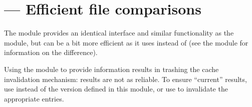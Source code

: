 \section{ ---
         Efficient file comparisons}



The  module provides an identical interface and similar
functionality as the  module, but can be a bit more efficient
as it uses  instead of 
(see the  module for information on the
difference).

  Using the  module to provide
 information results in trashing the cache
invalidation mechanism: results are not as reliable.  To ensure
``current'' results, use  instead of the version
defined in this module, or use  to
invalidate the appropriate entries.
